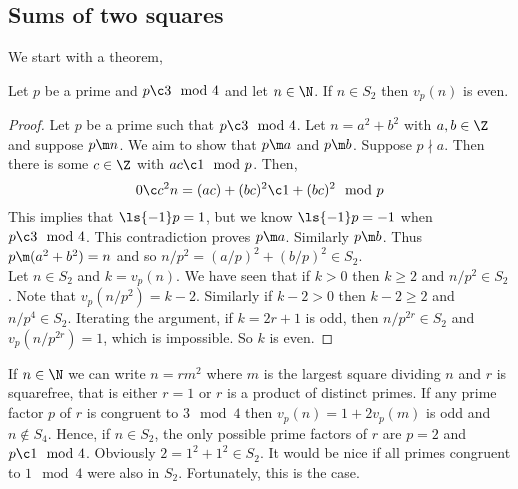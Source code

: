 \subsection{Sums of two squares}
We start with a theorem,
\begin{nthm}[]
  Let $p$ be a prime and $p \c 3 \mod 4$ and let $n \in \N$. If $n \in S_2$ then $v_p(n)$ is even.
\end{nthm}
\begin{proof}
  Let $p$ be a prime such that $p \c 3 \mod 4$. Let $n = a^2 + b^2$ with $a, b \in \Z$ and suppose $p \m n$. We aim to show that $p \m a$ and $p \m b$. Suppose $p \nmid a$. Then there is some $c \in \Z$ with $ac \c 1\mod p$. Then,
  $$ 0 \c c^2n = (ac) + (bc)^2 \c 1 + (bc)^2 \mod p $$
  This implies that $\ls {-1} p = 1$, but we know $\ls {-1} p = -1$ when $p \c 3 \mod 4$. This contradiction proves $p \m a$. Similarly $p \m b$. Thus $p \m (a^2 + b^2) = n$ and so $n/p^2 = (a/p)^2 + (b/p)^2 \in S_2$.\\

  \noindent
  Let $n \in S_2$ and $k = v_p(n)$. We have seen that if $k > 0$ then $k \ge 2$ and $n/p^2 \in S_2$. Note that $v_p(n/p^2) = k - 2$. Similarly if $k - 2> 0$ then $k - 2 \ge 2$ and $n/p^4 \in S_2$. Iterating the argument, if $k = 2r + 1$ is odd, then $n/p^{2r} \in S_2$ and $v_p(n/p^{2r}) = 1$, which is impossible. So $k$ is even.
\end{proof}

\begin{remark}
   If $n \in \N$ we can write $n = rm^2$ where $m$ is the largest square dividing $n$ and $r$ is squarefree, that is either $r = 1$ or $r$ is a product of distinct primes. If any prime factor $p$ of $r$ is congruent to $3\mod 4$ then $v_p(n) = 1 + 2v_p(m)$ is odd and $n \notin S_4$. Hence, if $n \in S_2$, the only possible prime factors of $r$ are $p = 2$ and $p \c 1 \mod 4$.  Obviously $2 = 1^2 + 1^2 \in S_2$.
   It would be nice if all primes congruent to $1 \mod 4$ were also in $S_2$. Fortunately, this is the case.
\end{remark}

